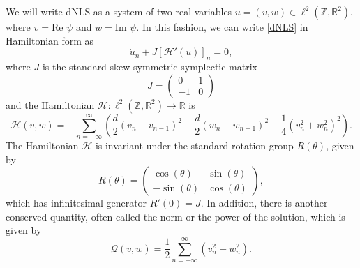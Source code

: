 \documentclass[12pt]{article}
\def\R{{\mathbb R}}
\def\Z{{\mathbb Z}}
\begin{document}
We will write dNLS as a system of two real variables $u = (v, w) \in \ell^2(\Z, \R^2)$, where $v = \text{Re }\psi$ and $w = \text{Im }\psi$. In this fashion, we can write \eqref{dNLS} in Hamiltonian form as
\begin{equation}\label{dNLSrealHam}
\dot{u}_n + J [\mathcal{H}'(u)]_n = 0,
\end{equation}
where $J$ is the standard skew-symmetric symplectic matrix
\[
J = \begin{pmatrix}0 & 1 \\ -1 & 0\end{pmatrix}
\]
and the Hamiltonian $\mathcal{H}: \ell^2(\Z,\R^2) \rightarrow \R$ is
\begin{equation}\label{dNLSrealH}
\mathcal{H}(v, w) = -\sum_{n = -\infty}^\infty 
\left( \frac{d}{2}\left(v_n - v_{n-1}\right)^2 + \frac{d}{2}\left(w_n - w_{n-1}\right)^2 - \frac{1}{4}\left( v_n^2 + w_n^2 \right)^2 \right).
\end{equation}
The Hamiltonian $\mathcal{H}$ is invariant under the standard rotation group $R(\theta)$, given by
\begin{equation}\label{Rtheta}
R(\theta) = \begin{pmatrix}
\cos(\theta) & \sin(\theta) \\
-\sin(\theta)& \cos(\theta)
\end{pmatrix},
\end{equation}
which has infinitesimal generator $R'(0) = J$. In addition, there is another conserved quantity, often called the norm or the power of the solution, which is given by
\begin{equation}\label{dNLSQ}
\mathcal{Q}(v, w) = \frac{1}{2} \sum_{n = -\infty}^\infty 
\left( v_n^2 + w_n ^2\right).
\end{equation}
\end{document}

